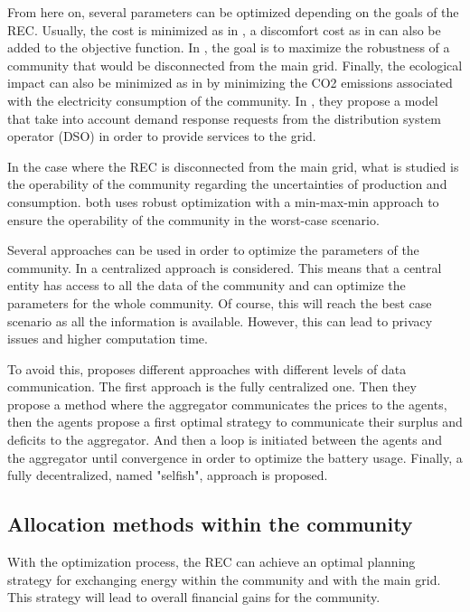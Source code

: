 \documentclass[12pt,a4paper]{article}
\begin{document}
From here on, several parameters can be optimized depending on the goals of the REC. Usually, the cost is minimized as in \cite{article_1, article_7, these_celik}, a discomfort cost as in \cite{article_6} can also be added to the objective function. In \cite{article_5}, the goal is to maximize the robustness of a community that would be disconnected from the main grid. Finally, the ecological impact can also be minimized as in \cite{these_sorel} by minimizing the CO2 emissions associated with the electricity consumption of the community. In \cite{article_7}, they propose a model that take into account demand response requests from the distribution system operator (DSO) in order to provide services to the grid.

In the case where the REC is disconnected from the main grid, what is studied is the operability of the community regarding the uncertainties of production and consumption. \cite{article_3, article_5} both uses robust optimization with a min-max-min approach to ensure the operability of the community in the worst-case scenario.

Several approaches can be used in order to optimize the parameters of the community. In \cite{article_6, article_1} a centralized approach is considered. This means that a central entity has access to all the data of the community and can optimize the parameters for the whole community. Of course, this will reach the best case scenario as all the information is available. However, this can lead to privacy issues and higher computation time. 

To avoid this, \cite{these_celik} proposes different approaches with different levels of data communication. The first approach is the fully centralized one. Then they propose a method where the aggregator communicates the prices to the agents, then the agents propose a first optimal strategy to communicate their surplus and deficits to the aggregator. And then  a loop is initiated between the agents and the aggregator until convergence in order to optimize the battery usage. Finally, a fully decentralized, named "selfish", approach is proposed.


\subsection{Allocation methods within the community}

With the optimization process, the REC can achieve an optimal planning strategy for exchanging energy within the community and with the main grid. This strategy will lead to overall financial gains for the community. 
\end{document}
